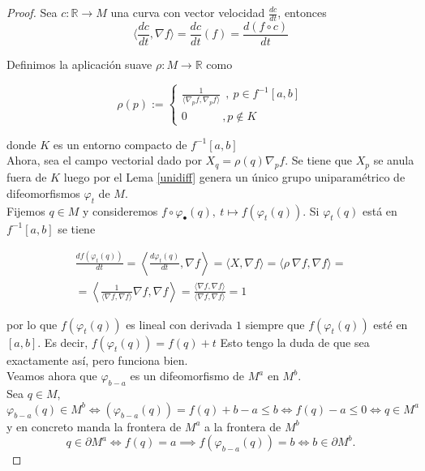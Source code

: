 \begin{proof}
    Sea $c:\mathbb{R}\to M$ una curva con vector velocidad $\frac{dc}{dt}$, entonces
    \begin{equation*}
        \langle \frac{dc}{dt}, \nabla f\rangle = \frac{dc}{dt}(f)=\frac{d(f\circ c)}{dt}
    \end{equation*}

    Definimos la aplicación suave $\rho : M\to \mathbb{R}$ como

    \begin{equation*}
        \rho(p):=
        \begin{cases}
            \frac{1}{\langle \nabla_pf, \nabla_pf\rangle}~~,~p\in f^{-1}[a,b]\\
            0 ~~~~~~~~~~~~~~,p\notin K
        \end{cases}
    \end{equation*}

    donde $K$ es un entorno compacto de $f^{-1}[a,b]$\\

    Ahora, sea el campo vectorial dado por $X_q=\rho(q)\nabla_pf$. Se tiene que $X_p$ se anula fuera de $K$ luego por el Lema \ref{unidiff} genera un único grupo uniparamétrico de difeomorfismos $\varphi_t$ de $M$.\\

    Fijemos $q\in M$ y consideremos $f\circ\varphi_{\bullet}(q),~t\mapsto f(\varphi_t(q))$. Si $\varphi_t(q)$ está en $f^{-1}[a,b]$ se tiene

    \begin{align*}
        \frac{df(\varphi_t(q))}{dt} = \left\langle \frac{d\varphi_t(q)}{dt},\nabla f\right\rangle = \langle X, \nabla f\rangle = \langle \rho~ \nabla f, \nabla f\rangle =\\ =\left\langle \frac{1}{\langle \nabla f,\nabla f\rangle}\nabla f,\nabla f\right\rangle=
        \frac{\langle \nabla f,\nabla f\rangle}{\langle \nabla f,\nabla f\rangle}= 1
    \end{align*}

    por lo que $f(\varphi_t(q))$ es lineal con derivada $1$ siempre que $f(\varphi_t(q))$ esté en $[a,b]$. Es decir, $f(\varphi_t(q))=f(q)+t$ {\color{blue}Esto tengo la duda de que sea exactamente así, pero funciona bien.}\\

    Veamos ahora que $\varphi_{b-a}$ es un difeomorfismo de $M^a$ en $M^b$.\\

    Sea $q\in M$,
    \begin{equation*}
        \varphi_{b-a}(q)\in M^b \iff(\varphi_{b-a}(q))=f(q)+b-a\le b \iff f(q)-a\le 0 \iff q\in M^a
    \end{equation*}
     y en concreto manda la frontera de $M^a$ a la frontera de $M^b$
     \begin{equation*}
         q\in \partial M^a \iff f(q)=a \implies f(\varphi_{b-a}(q))=b \iff b\in \partial M^b.
     \end{equation*}


\end{proof}
